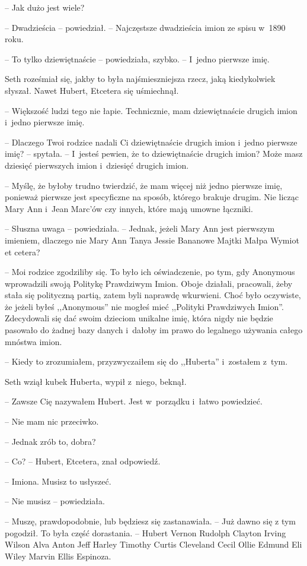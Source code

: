 \documentclass[oneside,polish,11pt,sfheadings]{mwbk}
\begin{document}
-- Jak dużo jest wiele?

-- Dwadzieścia -- powiedział. -- Najczęstsze dwadzieścia imion ze spisu w~1890 roku.

-- To tylko dziewiętnaście -- powiedziała, szybko. -- I~jedno pierwsze
imię.

Seth roześmiał się, jakby to była najśmieszniejsza rzecz, jaką
kiedykolwiek słyszał. Nawet Hubert, Etcetera się uśmiechnął. 

-- Większość
ludzi tego nie łapie. Technicznie, mam dziewiętnaście drugich imion i~jedno pierwsze imię.

-- Dlaczego Twoi rodzice nadali Ci dziewiętnaście drugich imion i~jedno
pierwsze imię? -- spytała. -- I~jesteś pewien, że to dziewiętnaście
drugich imion? Może masz dziesięć pierwszych imion i~dziesięć drugich
imion.

-- Myślę, że byłoby trudno twierdzić, że mam więcej niż jedno pierwsze
imię, ponieważ pierwsze jest specyficzne na sposób, którego brakuje
drugim. Nie licząc Mary Ann i~Jean Marc'ów czy innych, które mają umowne
łączniki.

-- Słuszna uwaga -- powiedziała. -- Jednak, jeżeli Mary Ann jest pierwszym
imieniem, dlaczego nie Mary Ann Tanya Jessie Bananowe Majtki Małpa
Wymiot et cetera?

-- Moi rodzice zgodziliby się. To było ich oświadczenie, po tym, gdy
Anonymous wprowadzili swoją Politykę Prawdziwym Imion. Oboje działali,
pracowali, żeby stała się polityczną partią, zatem byli naprawdę
wkurwieni. Choć było oczywiste, że jeżeli byłeś ,,Anonymous'' nie mogłeś
mieć ,,Polityki Prawdziwych Imion''. Zdecydowali się dać swoim dzieciom
unikalne imię, która nigdy nie będzie pasowało do żadnej bazy danych i~dałoby im prawo do legalnego używania całego mnóstwa imion.

-- Kiedy to zrozumiałem, przyzwyczaiłem się do ,,Huberta'' i~zostałem z~tym.

Seth wziął kubek Huberta, wypił z~niego, beknął. 

-- Zawsze Cię nazywałem
Hubert. Jest w~porządku i~łatwo powiedzieć.

-- Nie mam nic przeciwko.

-- Jednak zrób to, dobra?

-- Co? -- Hubert, Etcetera, znał odpowiedź.

-- Imiona. Musisz to usłyszeć.

-- Nie musisz -- powiedziała.

-- Muszę, prawdopodobnie, lub będziesz się zastanawiała. -- Już dawno się
z tym pogodził. To była część dorastania. -- Hubert Vernon Rudolph
Clayton Irving Wilson Alva Anton Jeff Harley Timothy Curtis Cleveland
Cecil Ollie Edmund Eli Wiley Marvin Ellis Espinoza.
\end{document}
